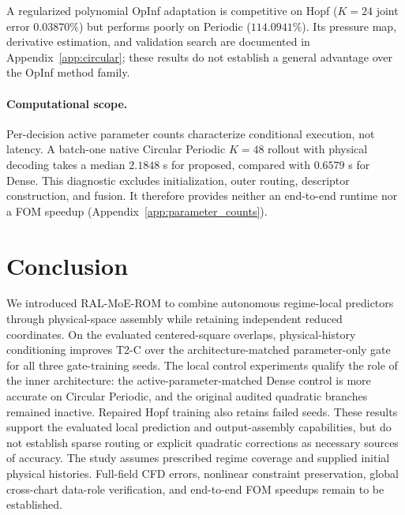 \documentclass{article}
\begin{document}
A regularized polynomial OpInf adaptation is competitive on Hopf
($K=24$ joint error $0.03870\%$) but performs poorly on Periodic
($114.0941\%$). Its pressure map, derivative estimation, and validation
search are documented in Appendix~\ref{app:circular}; these results do
not establish a general advantage over the OpInf method family.

\paragraph{Computational scope.}
Per-decision active parameter counts characterize conditional execution,
not latency. A batch-one native Circular Periodic $K=48$ rollout with
physical decoding takes a median $2.1848$ s for proposed, compared with
$0.6579$ s for Dense. This diagnostic excludes initialization, outer
routing, descriptor construction, and fusion. It therefore provides
neither an end-to-end runtime nor a FOM speedup
(Appendix~\ref{app:parameter_counts}).

\FloatBarrier
\section{Conclusion}
We introduced RAL-MoE-ROM to combine autonomous regime-local predictors
through physical-space assembly while retaining independent reduced
coordinates. On the evaluated centered-square overlaps, physical-history
conditioning improves T2-C over the architecture-matched parameter-only
gate for all three gate-training seeds. The local control experiments
qualify the role of the inner architecture: the active-parameter-matched
Dense control is more accurate on Circular Periodic, and the original
audited quadratic branches remained inactive. Repaired Hopf training
also retains failed seeds. These results support the evaluated local
prediction and output-assembly capabilities, but do not establish sparse
routing or explicit quadratic corrections as necessary sources of
accuracy. The study assumes prescribed regime coverage and supplied
initial physical histories. Full-field CFD errors, nonlinear
constraint preservation, global cross-chart data-role verification,
and end-to-end FOM speedups remain to be established.
\end{document}
